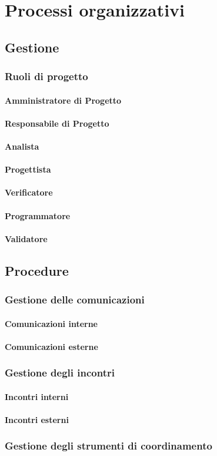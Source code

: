 \section{Processi organizzativi}
\subsection{Gestione}
\subsubsection{Ruoli di progetto}
\paragraph{Amministratore di Progetto}
\paragraph{Responsabile di Progetto}
\paragraph{Analista}
\paragraph{Progettista}
\paragraph{Verificatore}
\paragraph{Programmatore}
\paragraph{Validatore}
\subsection{Procedure}
\subsubsection{Gestione delle comunicazioni}
\paragraph{Comunicazioni interne}
\paragraph{Comunicazioni esterne}
\subsubsection{Gestione degli incontri}
\paragraph{Incontri interni}
\paragraph{Incontri esterni}
\subsubsection{Gestione degli strumenti di coordinamento}